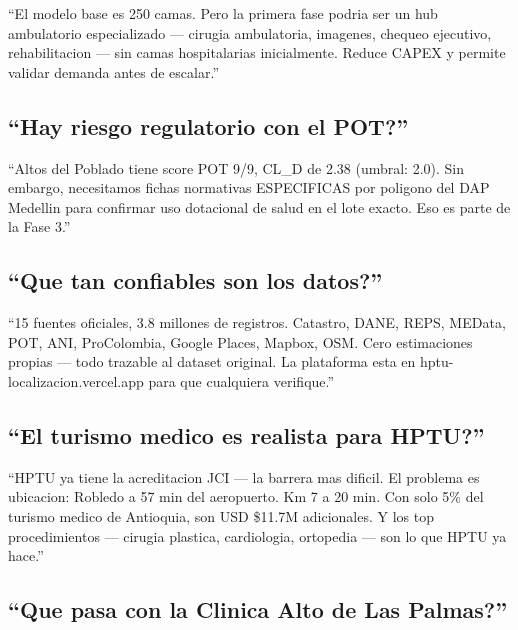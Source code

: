 \documentclass[11pt, a4paper]{article}
\begin{document}
\begin{tip}
``El modelo base es 250 camas. Pero la primera fase podria ser un hub ambulatorio especializado --- cirugia ambulatoria, imagenes, chequeo ejecutivo, rehabilitacion --- sin camas hospitalarias inicialmente. Reduce CAPEX y permite validar demanda antes de escalar.''
\end{tip}

\subsection{``Hay riesgo regulatorio con el POT?''}

\begin{tip}
``Altos del Poblado tiene score POT 9/9, CL\_D de 2.38 (umbral: 2.0). Sin embargo, necesitamos fichas normativas ESPECIFICAS por poligono del DAP Medellin para confirmar uso dotacional de salud en el lote exacto. Eso es parte de la Fase 3.''
\end{tip}

\subsection{``Que tan confiables son los datos?''}

\begin{tip}
``15 fuentes oficiales, 3.8 millones de registros. Catastro, DANE, REPS, MEData, POT, ANI, ProColombia, Google Places, Mapbox, OSM. Cero estimaciones propias --- todo trazable al dataset original. La plataforma esta en hptu-localizacion.vercel.app para que cualquiera verifique.''
\end{tip}

\subsection{``El turismo medico es realista para HPTU?''}

\begin{tip}
``HPTU ya tiene la acreditacion JCI --- la barrera mas dificil. El problema es ubicacion: Robledo a 57 min del aeropuerto. Km 7 a 20 min. Con solo 5\% del turismo medico de Antioquia, son USD \$11.7M adicionales. Y los top procedimientos --- cirugia plastica, cardiologia, ortopedia --- son lo que HPTU ya hace.''
\end{tip}

\subsection{``Que pasa con la Clinica Alto de Las Palmas?''}
\end{document}
